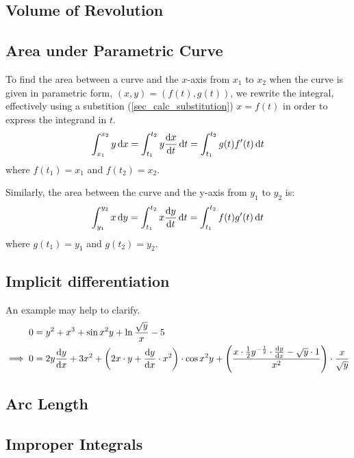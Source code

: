 \subsection{Volume of Revolution}

\subsection{Area under Parametric Curve} \label{sec_calc_parametric_area}

To find the area between a curve and the \(x\)-axis from \(x_1\) to \(x_2\)
when the curve is given in parametric form, \((x, y) = (f(t), g(t))\),
we rewrite the integral, effectively using a substition
(\ref{sec_calc_substitution}) \(x = f(t)\) in order to express the integrand
in \(t\).
\begin{equation}
\int_{x_1}^{x_2} y \dd{x} =
 \int_{t_1}^{t_2} y \dv{x}{t} \dd{t} =
 \int_{t_1}^{t_2} g(t)f'(t) \dd{t}
\end{equation}
where \(f(t_1) = x_1\) and \(f(t_2) = x_2\).

Similarly, the area between the curve and the y-axis from \(y_1\) to \(y_2\)
is:
\begin{equation}
\int_{y_1}^{y_2} x \dd{y} =
 \int_{t_1}^{t_2} x \dv{y}{t} \dd{t} =
 \int_{t_1}^{t_2} f(t)g'(t) \dd{t}
\end{equation}
where \(g(t_1) = y_1\) and \(g(t_2) = y_2\).

\subsection{Implicit differentiation}



An example may help to clarify.
\begin{align*}
0 &= y^2 + x^3 + \sin x^2 y + \ln \frac{\sqrt y} x - 5 \\
\implies 0 &=
            2y \dv{y}{x} + 3x^2 +
            \pqty{2x \cdot y + \dv{y}{x} \cdot x^2} \cdot \cos x^2 y +
            \pqty{\frac{x \cdot \frac 12 y^{-\frac 12} \cdot \dv{y}{x} -
                        \sqrt y \cdot 1}
                       {x^2}} \cdot \frac{x}{\sqrt y} \\
\end{align*}


\subsection{Arc Length}

\subsection{Improper Integrals}

